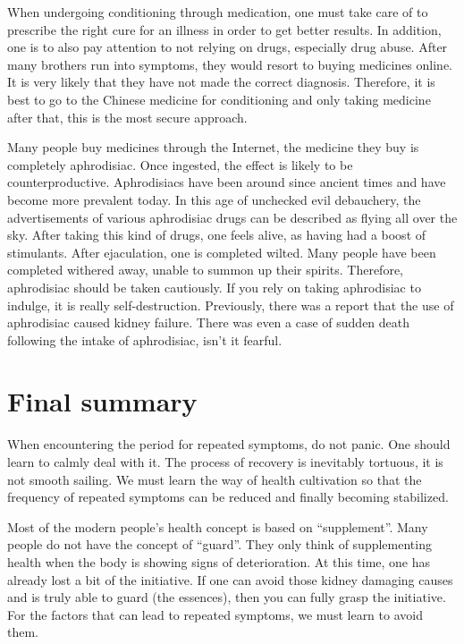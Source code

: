 \documentclass[
]{book}
\begin{document}
When undergoing conditioning through medication, one must take care of to prescribe the right cure for an illness in order to get better results. In addition, one is to also pay attention to not relying on drugs, especially drug abuse. After many brothers run into symptoms, they would resort to buying medicines online. It is very likely that they have not made the correct diagnosis. Therefore, it is best to go to the Chinese medicine for conditioning and only taking medicine after that, this is the most secure approach.

Many people buy medicines through the Internet, the medicine they buy is completely aphrodisiac. Once ingested, the effect is likely to be counterproductive. Aphrodisiacs have been around since ancient times and have become more prevalent today. In this age of unchecked evil debauchery, the advertisements of various aphrodisiac drugs can be described as flying all over the sky. After taking this kind of drugs, one feels alive, as having had a boost of stimulants. After ejaculation, one is completed wilted. Many people have been completed withered away, unable to summon up their spirits. Therefore, aphrodisiac should be taken cautiously. If you rely on taking aphrodisiac to indulge, it is really self-destruction. Previously, there was a report that the use of aphrodisiac caused kidney failure. There was even a case of sudden death following the intake of aphrodisiac, isn't it fearful.

\hypertarget{final-summary-3}{%
\section{Final summary}\label{final-summary-3}}

When encountering the period for repeated symptoms, do not panic. One should learn to calmly deal with it. The process of recovery is inevitably tortuous, it is not smooth sailing. We must learn the way of health cultivation so that the frequency of repeated symptoms can be reduced and finally becoming stabilized.

Most of the modern people's health concept is based on ``supplement''. Many people do not have the concept of ``guard''. They only think of supplementing health when the body is showing signs of deterioration. At this time, one has already lost a bit of the initiative. If one can avoid those kidney damaging causes and is truly able to guard (the essences), then you can fully grasp the initiative. For the factors that can lead to repeated symptoms, we must learn to avoid them.
\end{document}
